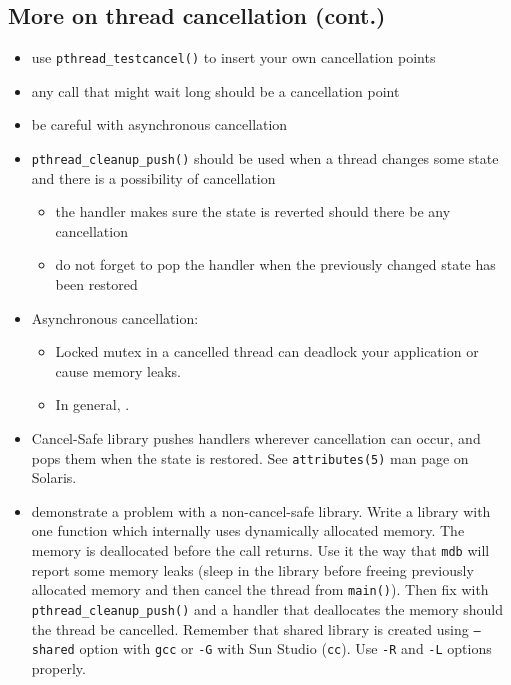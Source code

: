 
\subsection{More on thread cancellation (cont.)}

\begin{itemize}
\item use \texttt{pthread\_testcancel()} to insert your own cancellation points
\item any call that might wait long should be a cancellation point
\item be careful with asynchronous cancellation
\item \texttt{pthread\_cleanup\_push()} should be used when a thread changes
some state and there is a possibility of cancellation
	\begin{itemize}
	\item the handler makes sure the state is reverted should there be any
	cancellation
	\item do not forget to pop the handler when the previously changed state
	has been restored
	\end{itemize}
\end{itemize}


\begin{itemize}
\item Asynchronous cancellation:
\begin{itemize}
\item Locked mutex in a cancelled thread can deadlock your application
or cause memory leaks.
\item In general, .
\end{itemize}
\item Cancel-Safe library pushes handlers wherever cancellation can occur, and
pops them when the state is restored. See \texttt{attributes(5)} man page on
Solaris.
\item {} demonstrate a problem with a non-cancel-safe library.
Write a library with one function which internally uses dynamically allocated
memory. The memory is deallocated before the call returns. Use it the way that
\texttt{mdb} will report some memory leaks (sleep in the library before freeing
previously allocated memory and then cancel the thread from \texttt{main()}).
Then fix with \texttt{pthread\_cleanup\_push()} and a handler that deallocates
the memory should the thread be cancelled. Remember that shared library is
created using \texttt{--shared} option with \texttt{gcc} or \texttt{-G} with Sun
Studio (\texttt{cc}). Use \texttt{-R} and \texttt{-L} options properly.
\end{itemize}

